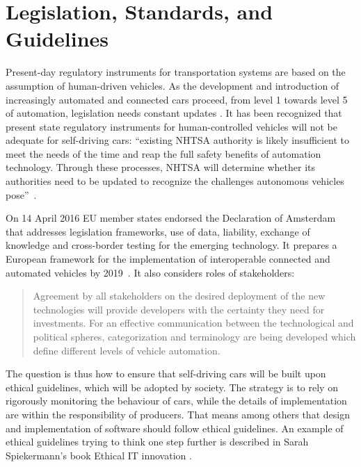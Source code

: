 \section{Legislation, Standards, and Guidelines}
\label{sec:LegislationStandardGuidelines}

Present-day regulatory instruments for transportation systems are based on the assumption of human-driven vehicles. As the development and introduction of increasingly automated and connected cars proceed, from level 1 towards level 5 of automation, legislation needs constant updates \cite{EthicsCommission2017pr,EthicsCommission2017b,Pillath2016,NHTSA2016PolicyUpdate}. It has been recognized that present state regulatory instruments for human-controlled vehicles will not be adequate for self-driving cars: \enquote{existing NHTSA authority is likely insufficient to meet the needs of the time and reap the full safety benefits of automation technology. Through these processes, NHTSA will determine whether its authorities need to be updated to recognize the challenges autonomous vehicles pose}~\cite{NHTSA2016PolicyUpdate}. %

On 14 April 2016 EU member states endorsed the Declaration of Amsterdam \cite{GovernmentNL2017} that addresses legislation frameworks, use of data, liability, exchange of knowledge and cross-border testing for the emerging technology. It prepares a European framework for the implementation of interoperable connected and automated vehicles by 2019~\cite{EthicsCommission2017b}. It also considers roles of stakeholders:

 \begin{quote}
 Agreement by all stakeholders on the desired deployment of the new technologies will provide developers with the certainty they need for investments. For an effective communication between the technological and political spheres, categorization and terminology are being developed which define different levels of vehicle automation. \cite{Pillath2016} %
 \end{quote} %
 
The question is thus how to ensure that self-driving cars will be built upon ethical guidelines, which will be adopted by society. The strategy is to rely on rigorously monitoring the behaviour of cars, while the details of implementation are within the responsibility of producers. That means among others that design and implementation of software should follow ethical guidelines. An example of ethical guidelines trying to think one step further is described in Sarah Spiekermann's book Ethical IT innovation \cite{spiekermann2015ethical}. 

